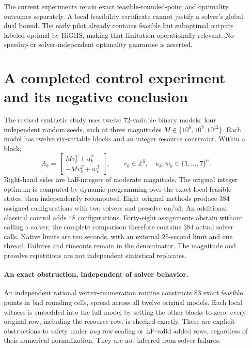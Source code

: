 \documentclass[11pt]{article}
\begin{document}
The current experiments retain exact feasible-rounded-point and optimality outcomes
separately. A local feasibility certificate cannot justify a solver's global dual
bound. The early pilot already contains feasible but suboptimal outputs labeled
optimal by HiGHS, making that limitation operationally relevant. No speedup or
solver-independent optimality guarantee is asserted.

\section{A completed control experiment and its negative conclusion}
The revised synthetic study uses twelve 72-variable binary models: four independent
random seeds, each at three magnitudes $M\in\{10^6,10^9,10^{12}\}$. Each model has
twelve six-variable blocks and an integer resource constraint. Within a block,
\[
 A_k=\begin{bmatrix}M v_k^T+u_k^T\\-M v_k^T+w_k^T\end{bmatrix},
 \qquad v_k\in\mathbb Z^6,\quad u_k,w_k\in\{1,\ldots,7\}^6.
\]
Right-hand sides are half-integers of moderate magnitude. The original integer
optimum is computed by dynamic programming over the exact local feasible states,
then independently recomputed. Eight original methods produce 384 assigned
configurations with two solvers and presolve on/off. An additional classical control
adds 48 configurations. Forty-eight assignments abstain without calling a solver;
the complete comparison therefore contains 384 actual solver calls. Native limits
are ten seconds, with an external 25-second limit and one thread. Failures and
timeouts remain in the denominator. The magnitude and presolve repetitions are
not independent statistical replicates.

\paragraph{An exact obstruction, independent of solver behavior.}
An independent rational vertex-enumeration routine constructs 83 exact feasible
points in bad rounding cells, spread across all twelve original models. Each local
witness is embedded into the full model by setting the other blocks to zero; every
original row, including the resource row, is checked exactly. These are explicit
obstructions to safety under \emph{any} row scaling or LP-valid added rows, regardless
of their numerical normalization. They are not inferred from solver failures.
\end{document}
